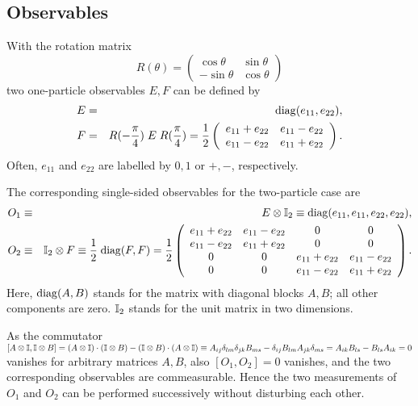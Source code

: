 \documentclass[pra,showpacs,showkeys,amsfonts]{revtex4}
\begin{document}
\subsection{Observables}
With the rotation matrix
\begin{equation}
R(\theta ) =
\left(
\begin{array}{cccc}
\cos \theta &\sin \theta \\
-\sin \theta &\cos \theta
\end{array}
\right)
\end{equation}
two one-particle observables $E,F$ can be defined by
\begin{eqnarray}
E &=&
{\rm diag}(e_{11},e_{22}),
\label{2004-analog-Epiover4}
\\
F &=& R(-{\pi \over 4})\; E \; R({\pi \over 4})
=
{1\over {2}}\left(
\begin{array}{cccc}
e_{11}+e_{22}&e_{11}-e_{22}\\
e_{11}-e_{22}&e_{11}+e_{22}
\end{array}
\right) .
\label{2004-analog-Epiover4b}
\end{eqnarray}
Often,
$e_{11}$
and
$e_{22}$
are  labelled by $0,1$ or $+,-$, respectively.

The corresponding single-sided observables for the two-particle case are
\begin{eqnarray}
O_1 &\equiv & E \otimes {\Bbb I}_2 \equiv
{\rm diag}(e_{11}, e_{11}, e_{22}, e_{22})
,
\\
O_2 &\equiv & {\Bbb I}_2 \otimes F \equiv  {1\over {2}} \;
{\rm diag}(F, F) =
{1\over {2}}\left(
\begin{array}{cccc}
e_{11} + e_{22}& e_{11} - e_{22}& 0& 0  \\
e_{11} - e_{22}& e_{11} + e_{22}& 0& 0    \\
0& 0& e_{11} + e_{22}& e_{11} - e_{22}      \\
0& 0& e_{11} - e_{22}& e_{11} + e_{22}
\end{array}
\right)
.
\end{eqnarray}
Here, ${\rm diag}(A, B)$ stands for the matrix with diagonal blocks $A,B$; all other components are zero.
${\Bbb I}_2$ stands for the unit matrix in two dimensions.

As the commutator
$[A \otimes {\Bbb I},{\Bbb I} \otimes B]=
(A \otimes {\Bbb I})\cdot({\Bbb I} \otimes B) -
({\Bbb I} \otimes B)\cdot(A \otimes {\Bbb I})
\equiv
A_{ij}\delta_{lm}\delta_{jk}B_{ms} -
\delta_{ij}B_{lm}A_{jk}\delta_{ms}
=
A_{ik}B_{ls}-B_{ls}A_{ik}
=0
$
vanishes for arbitrary matrices $A,B$, also $[O_1,O_2]=0$ vanishes,
and the two corresponding observables are commeasurable.
Hence the two measurements of $O_1$ and $O_2$ can be performed successively without
disturbing each other.
\end{document}
